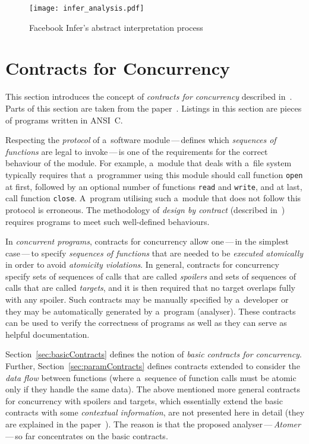 \begin{figure}[hbt]
    \centering
    \texttt{[image: infer\_analysis.pdf]}
    \caption{%
        Facebook Infer's abstract interpretation
        process~\cite{inferAISlides, projectPracticeMarcin2018}
    }
    \label{fig:inferAnalysis}
\end{figure}


\section{Contracts for Concurrency}
\label{sec:contracts}

This section introduces the concept of \emph{contracts for concurrency}
described in~\cite{contracts2015, contracts2017}. Parts of this section are
taken from the paper~\cite{excel2019FBInfer}. Listings in this section are
pieces of programs written in ANSI~C.

Respecting the \emph{protocol} of a~software module\,---\,defines
which \emph{sequences of functions} are legal to invoke\,---\,is one of the
requirements for the correct behaviour of the module. For example, a~module
that deals with a~file system typically requires that a~programmer using
this module should call function \texttt{open} at first, followed by an
optional number of functions \texttt{read} and \texttt{write}, and at last,
call function \texttt{close}. A~program utilising such a~module that does
not follow this protocol is erroneous. The methodology of \emph{design by
contract} (described in~\cite{contract}) requires programs to meet
such well-defined behaviours.~\cite{contracts2015}

In \emph{concurrent programs}, contracts for concurrency allow
one\,---\,in the simplest case\,---\,to specify \emph{sequences of
functions} that are needed to be \emph{executed atomically} in order to
avoid \emph{atomicity violations}. In general, contracts for concurrency
specify sets of sequences of calls that are called \emph{spoilers} and sets
of sequences of calls that are called \emph{targets}, and it is then
required that no target overlaps fully with any spoiler. Such contracts may
be manually specified by a~developer or they may be automatically generated
by a~program (analyser). These contracts can be used to verify the
correctness of programs as well as they can serve as helpful documentation.

Section~\ref{sec:basicContracts} defines the notion of \emph{basic contracts
for concurrency}. Further, Section~\ref{sec:paramContracts} defines
contracts extended to consider the \emph{data flow} between functions
(where a~sequence of function calls must be atomic only if they handle the
same data). The above mentioned more general contracts for concurrency with
spoilers and targets, which essentially extend the basic contracts with
some \emph{contextual information}, are not presented here in detail
(they are explained in the paper~\cite{contracts2017}). The reason is that
the proposed analyser\,---\,\emph{Atomer}\,---\,so far concentrates on the
basic contracts.


